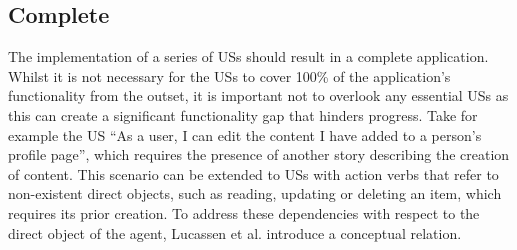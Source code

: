 \subsection*{\normalsize{Complete}}
The implementation of a series of USs should result in a complete application. Whilst it is not necessary for the USs to cover 100\% of the application's functionality from the outset, it is important not to overlook any essential USs as this can create a significant functionality gap that hinders progress. Take for example the US \enquote{As a user, I can edit the content I have added to a person's profile page}, which requires the presence of another story describing the creation of content. This scenario can be extended to USs with action verbs that refer to non-existent direct objects, such as reading, updating or deleting an item, which requires its prior creation. To address these dependencies with respect to the direct object of the agent, Lucassen et al. introduce a conceptual relation.
 
%
